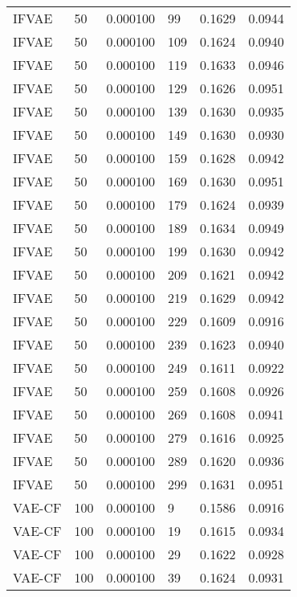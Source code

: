 \begin{tabular}{llrlrr}
   IFVAE &   50 &  0.000100 &    99 &  0.1629 &       0.0944 \\
   IFVAE &   50 &  0.000100 &   109 &  0.1624 &       0.0940 \\
   IFVAE &   50 &  0.000100 &   119 &  0.1633 &       0.0946 \\
   IFVAE &   50 &  0.000100 &   129 &  0.1626 &       0.0951 \\
   IFVAE &   50 &  0.000100 &   139 &  0.1630 &       0.0935 \\
   IFVAE &   50 &  0.000100 &   149 &  0.1630 &       0.0930 \\
   IFVAE &   50 &  0.000100 &   159 &  0.1628 &       0.0942 \\
   IFVAE &   50 &  0.000100 &   169 &  0.1630 &       0.0951 \\
   IFVAE &   50 &  0.000100 &   179 &  0.1624 &       0.0939 \\
   IFVAE &   50 &  0.000100 &   189 &  0.1634 &       0.0949 \\
   IFVAE &   50 &  0.000100 &   199 &  0.1630 &       0.0942 \\
   IFVAE &   50 &  0.000100 &   209 &  0.1621 &       0.0942 \\
   IFVAE &   50 &  0.000100 &   219 &  0.1629 &       0.0942 \\
   IFVAE &   50 &  0.000100 &   229 &  0.1609 &       0.0916 \\
   IFVAE &   50 &  0.000100 &   239 &  0.1623 &       0.0940 \\
   IFVAE &   50 &  0.000100 &   249 &  0.1611 &       0.0922 \\
   IFVAE &   50 &  0.000100 &   259 &  0.1608 &       0.0926 \\
   IFVAE &   50 &  0.000100 &   269 &  0.1608 &       0.0941 \\
   IFVAE &   50 &  0.000100 &   279 &  0.1616 &       0.0925 \\
   IFVAE &   50 &  0.000100 &   289 &  0.1620 &       0.0936 \\
   IFVAE &   50 &  0.000100 &   299 &  0.1631 &       0.0951 \\
  VAE-CF &  100 &  0.000100 &     9 &  0.1586 &       0.0916 \\
  VAE-CF &  100 &  0.000100 &    19 &  0.1615 &       0.0934 \\
  VAE-CF &  100 &  0.000100 &    29 &  0.1622 &       0.0928 \\
  VAE-CF &  100 &  0.000100 &    39 &  0.1624 &       0.0931 \\

\end{tabular}
